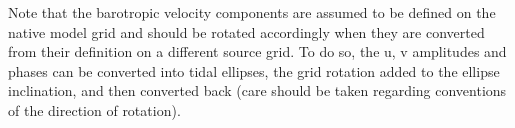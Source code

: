 \documentclass[../main/NEMO_manual]{subfiles}
\begin{document}
Note that the barotropic velocity components are assumed to be defined
on the native model grid and should be rotated accordingly when they
are converted from their definition on a different source grid. To do
so, the u, v amplitudes and phases can be converted into tidal
ellipses, the grid rotation added to the ellipse inclination, and then
converted back (care should be taken regarding conventions of the
direction of rotation). %

\subinc{}
\end{document}
